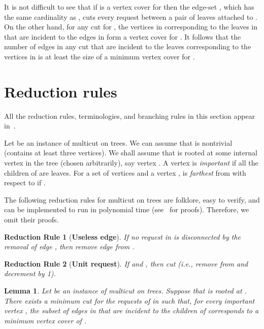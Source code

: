 \documentclass[11pt]{article}
\newtheorem{lemma}[theorem]{Lemma}
\newtheorem{reduction}{Reduction Rule}[section]
\begin{document}
It is not difficult to see that if  is a vertex cover for  then the
edge-set , which has the
same cardinality as , cuts every request between a pair of leaves
attached to . On the other hand, for any cut  for
, the vertices in  corresponding to the leaves in 
that are incident to the edges in  form a vertex cover for . It follows
that the number of edges in any cut  that are incident to the
leaves  corresponding to the vertices in  is at least the size of a minimum
vertex cover for .


\section{Reduction rules}
\label{sec:structure}

All the reduction rules, terminologies, and branching rules in this section appear in~\cite{multicut}.

Let  be an instance of {\sc multicut on trees}. We can assume that  is nontrivial (contains at least three vertices). We shall assume that  is rooted at some internal vertex in the tree (chosen arbitrarily), say vertex . A vertex  is {\em important} if all the children of  are leaves. For a set of vertices  and a vertex ,  is {\em farthest} from  with respect to  if .

The following reduction rules for {\sc multicut on trees} are folklore, easy to verify, and can be implemented to run in polynomial time (see~\cite{thomase,guo} for proofs). Therefore, we omit their proofs.

\begin{reduction} [{\bf Useless edge}]
\label{red:0.1}
If no request in  is disconnected by the removal of edge , then remove edge  from .
\end{reduction}


\begin{reduction} [{\bf Unit request}]
\label{red:0.3}
If  and , then cut  (i.e., remove  from  and decrement  by 1).
\end{reduction}



\begin{lemma}
\label{lem:minvc}
Let  be an instance of {\sc multicut on trees}. Suppose that  is rooted at . There exists a minimum cut  for the requests of  in  such that, for every important vertex , the subset of edges in  that are incident to the children of  corresponds to a minimum vertex cover of .
\end{lemma}
\end{document}
